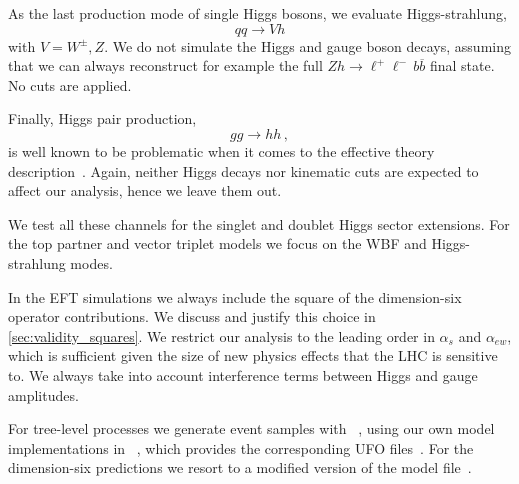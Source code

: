 As the last production mode of single Higgs bosons, we evaluate
Higgs-strahlung,
%
\begin{equation}
  q q \to V h
\end{equation}
%
with $V = W^\pm, Z$. We do not simulate the Higgs and gauge boson
decays, assuming that we can always reconstruct for example the full
$Zh \to \ell^+ \ell^- \, b \overbar{b}$ final state. No cuts are applied.

Finally, Higgs pair production,
%
\begin{equation}
  g g \to h h \,,
\end{equation}
%
is well known to be problematic when it comes to the effective theory
description~\cite{Baur:2002rb, Gillioz:2012se, Dawson:2012mk}. Again,
neither Higgs decays nor kinematic cuts are expected to affect our
analysis, hence we leave them out.

\newparagraph
%
We test all these channels for the singlet and doublet Higgs sector
extensions. For the top partner and vector triplet models we focus on
the WBF and Higgs-strahlung modes.

In the EFT simulations we always include the square of the
dimension-six operator contributions. We discuss and
justify this choice in \autoref{sec:validity_squares}.
%
%
We restrict our analysis to the leading order in $\alpha_s$ and
$\alpha_{ew}$, which is sufficient given the size of new physics
effects that the LHC is sensitive to. We always take into account
interference terms between Higgs and gauge amplitudes.

For tree-level processes we generate event samples with
~\cite{Alwall:2014hca}, using our own model
implementations in ~\cite{Alloul:2013bka}, which
provides the corresponding UFO files~\cite{Degrande:2011ua}.  For the
dimension-six predictions we resort to a modified version of the
 model file~\cite{Alloul:2013naa}.

